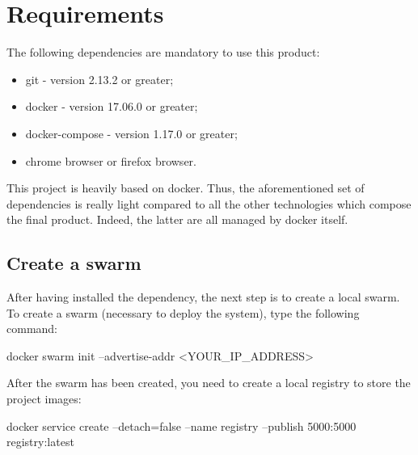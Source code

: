 \section{Requirements}\label{req}

The following dependencies are mandatory to use this product:
\begin{itemize}
   \item git - version 2.13.2 or greater;
   \item docker - version 17.06.0 or greater;
   \item docker-compose - version 1.17.0 or greater;
   \item chrome browser or firefox browser.
\end{itemize}

This project is heavily based on docker. Thus, the aforementioned
set of dependencies is really light compared to all the other
technologies which compose the final product.
Indeed, the latter are all managed by docker itself.

\subsection{Create a swarm}
After having installed the dependency, the next step is to create a local swarm.
To create a swarm (necessary to deploy the system), type the following command:

docker swarm init --advertise-addr <YOUR_IP_ADDRESS>

After the swarm has been created, you need to create a local registry to store
the project images:

docker service create --detach=false --name registry --publish 5000:5000 registry:latest
